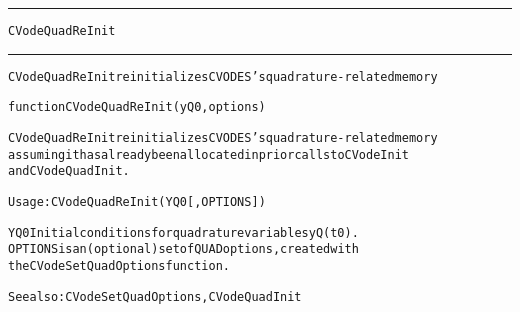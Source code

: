 \begin{samepage}
\hrule
\begin{center}
{\large \verb!CVodeQuadReInit!}
\label{p:CVodeQuadReInit}
\end{center}
\hrule\vspace{0.1in}



\begin{alltt}
CVodeQuadReInit reinitializes CVODES's quadrature-related memory
\end{alltt}

\end{samepage}



\begin{samepage}


\begin{alltt}
function CVodeQuadReInit(yQ0, options) 
\end{alltt}

\end{samepage}



\begin{alltt}
CVodeQuadReInit reinitializes CVODES's quadrature-related memory
   assuming it has already been allocated in prior calls to CVodeInit 
   and CVodeQuadInit.

   Usage: CVodeQuadReInit ( YQ0 [, OPTIONS ] ) 

   YQ0      Initial conditions for quadrature variables yQ(t0).
   OPTIONS  is an (optional) set of QUAD options, created with
            the CVodeSetQuadOptions function. 

   See also: CVodeSetQuadOptions, CVodeQuadInit
\end{alltt}






\vspace{0.1in}